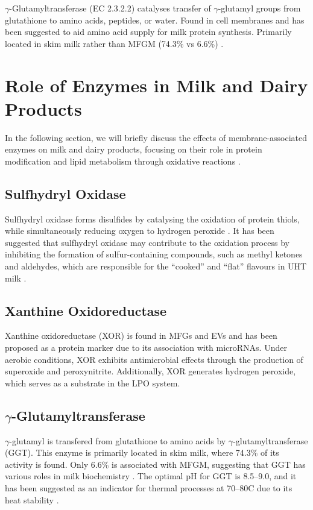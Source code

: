 \vline

$\gamma$-Glutamyltransferase (EC 2.3.2.2) catalyses transfer of $\gamma$-glutamyl groups from glutathione to amino acids, peptides, or water. Found in cell membranes and  has been suggested to aid amino acid supply for milk protein synthesis. Primarily located in skim milk rather than MFGM (74.3\% vs 6.6\%) \cite*{RM_01}.

\section{Role of Enzymes in Milk and Dairy Products}

In the following section, we will briefly discuss the effects of membrane-associated enzymes on milk and dairy products, focusing on their role in protein modification and lipid metabolism through oxidative reactions \cite{RM_01}.

\subsection*{Sulfhydryl Oxidase}
Sulfhydryl oxidase forms disulfides by catalysing the oxidation of protein thiols, while simultaneously reducing oxygen to hydrogen peroxide \cite{RM_01}. It has been suggested that sulfhydryl oxidase may contribute to the oxidation process by inhibiting the formation of sulfur-containing compounds, such as methyl ketones and aldehydes, which are responsible for the “cooked” and “flat” flavours in UHT milk \cite{RM_01}.

\subsection*{Xanthine Oxidoreductase}
Xanthine oxidoreductase (XOR) is found in MFGs and EVs and has been proposed as a protein marker due to its association with microRNAs. Under aerobic conditions, XOR exhibits antimicrobial effects through the production of superoxide and peroxynitrite. Additionally, XOR generates hydrogen peroxide, which serves as a substrate in the LPO system.

\subsection*{$\gamma$-Glutamyltransferase}
$\gamma$-glutamyl is transfered from glutathione to amino acids by $\gamma$-glutamyltransferase (GGT). This enzyme is primarily located in skim milk, where 74.3\% of its activity is found. Only 6.6\% is associated with MFGM, suggesting that GGT has various roles in milk biochemistry \cite{RM_01}.
The optimal pH for GGT is 8.5–9.0, and it has been suggested as an indicator for thermal processes at 70–80\textdegree C due to its heat stability \cite{RM_01}.

